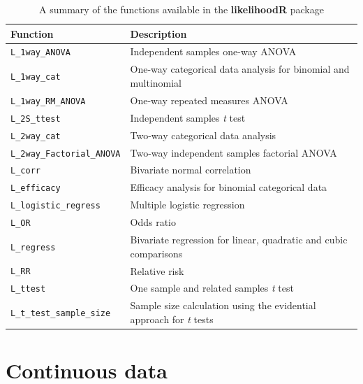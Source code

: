 \begin{table}[ht]  
\begin{center}  
\begin{tabular}{ll}  
\hline  
\textbf{Function} & \textbf{Description}\\
\hline  
\texttt{L\_1way\_ANOVA} &  Independent samples one-way ANOVA\\  
\texttt{L\_1way\_cat} & One-way categorical data analysis for binomial and multinomial\\
\texttt{L\_1way\_RM\_ANOVA} & One-way repeated measures ANOVA\\
\texttt{L\_2S\_ttest} &  Independent samples \emph{t} test\\  
\texttt{L\_2way\_cat} & Two-way categorical data analysis\\
\texttt{L\_2way\_Factorial\_ANOVA} & Two-way independent samples factorial ANOVA\\
\texttt{L\_corr} & Bivariate normal correlation\\
\texttt{L\_efficacy} & Efficacy analysis for binomial categorical data\\
\texttt{L\_logistic\_regress} & Multiple logistic regression\\
\texttt{L\_OR} & Odds ratio\\
\texttt{L\_regress} & Bivariate regression for linear, quadratic and cubic comparisons\\
\texttt{L\_RR} & Relative risk\\
\texttt{L\_ttest} & One sample and related samples \emph{t} test\\
\texttt{L\_t\_test\_sample\_size} & Sample size calculation using the evidential approach for \emph{t} tests\\
\hline  
\end{tabular}  
\caption{ A summary of the functions available in the \textbf{likelihoodR} package}  
\label{tab:Table2}  
\end{center}  
\end{table} 


\section{Continuous data}

